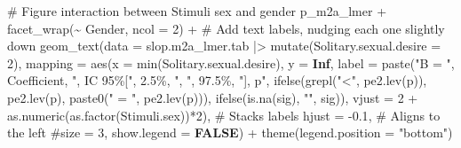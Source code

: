 \documentclass[
  bookmarksnumbered]{article}
\newenvironment{Shaded}{\begin{snugshade}}{\end{snugshade}}
\newcommand{\AttributeTok}[1]{\textcolor[rgb]{0.80,0.80,0.80}{#1}}
\newcommand{\CommentTok}[1]{\textcolor[rgb]{0.50,0.62,0.50}{#1}}
\newcommand{\ConstantTok}[1]{\textcolor[rgb]{0.86,0.64,0.64}{\textbf{#1}}}
\newcommand{\DecValTok}[1]{\textcolor[rgb]{0.86,0.86,0.80}{#1}}
\newcommand{\FloatTok}[1]{\textcolor[rgb]{0.75,0.75,0.82}{#1}}
\newcommand{\FunctionTok}[1]{\textcolor[rgb]{0.94,0.94,0.56}{#1}}
\newcommand{\NormalTok}[1]{\textcolor[rgb]{0.80,0.80,0.80}{#1}}
\newcommand{\SpecialCharTok}[1]{\textcolor[rgb]{0.86,0.64,0.64}{#1}}
\newcommand{\StringTok}[1]{\textcolor[rgb]{0.80,0.58,0.58}{#1}}
\begin{document}
\begin{Shaded}
\begin{Highlighting}[]
\CommentTok{\# Figure interaction between Stimuli sex and gender}
\NormalTok{p\_m2a\_lmer  }\SpecialCharTok{+}
  \FunctionTok{facet\_wrap}\NormalTok{(}\SpecialCharTok{\textasciitilde{}}\NormalTok{ Gender, }\AttributeTok{ncol =} \DecValTok{2}\NormalTok{) }\SpecialCharTok{+}
  \CommentTok{\# Add text labels, nudging each one slightly down}
  \FunctionTok{geom\_text}\NormalTok{(}\AttributeTok{data =}\NormalTok{ slop.m2a\_lmer.tab }\SpecialCharTok{|\textgreater{}} 
              \FunctionTok{mutate}\NormalTok{(}\AttributeTok{Solitary.sexual.desire =} \DecValTok{2}\NormalTok{),}
            \AttributeTok{mapping =} \FunctionTok{aes}\NormalTok{(}\AttributeTok{x =} \FunctionTok{min}\NormalTok{(Solitary.sexual.desire), }\AttributeTok{y =} \ConstantTok{Inf}\NormalTok{, }
                          \AttributeTok{label =} \FunctionTok{paste}\NormalTok{(}\StringTok{"B = "}\NormalTok{, Coefficient, }
                                        \StringTok{", IC 95\%["}\NormalTok{, }\StringTok{\textasciigrave{}}\AttributeTok{2.5\%}\StringTok{\textasciigrave{}}\NormalTok{, }\StringTok{", "}\NormalTok{, }\StringTok{\textasciigrave{}}\AttributeTok{97.5\%}\StringTok{\textasciigrave{}}\NormalTok{, }
                                        \StringTok{"], p"}\NormalTok{, }
                                        \FunctionTok{ifelse}\NormalTok{(}\FunctionTok{grepl}\NormalTok{(}\StringTok{"\textless{}"}\NormalTok{, }\FunctionTok{pe2.lev}\NormalTok{(p)), }\FunctionTok{pe2.lev}\NormalTok{(p), }
                                               \FunctionTok{paste0}\NormalTok{(}\StringTok{" = "}\NormalTok{, }\FunctionTok{pe2.lev}\NormalTok{(p))),}
                                        \FunctionTok{ifelse}\NormalTok{(}\FunctionTok{is.na}\NormalTok{(sig), }\StringTok{""}\NormalTok{, sig)),}
                          \AttributeTok{vjust =} \DecValTok{2} \SpecialCharTok{+} \FunctionTok{as.numeric}\NormalTok{(}\FunctionTok{as.factor}\NormalTok{(Stimuli.sex))}\SpecialCharTok{*}\DecValTok{2}\NormalTok{),  }\CommentTok{\# Stacks labels}
            \AttributeTok{hjust =} \SpecialCharTok{{-}}\FloatTok{0.1}\NormalTok{,  }\CommentTok{\# Aligns to the left}
            \CommentTok{\#size = 3,}
            \AttributeTok{show.legend =} \ConstantTok{FALSE}\NormalTok{) }\SpecialCharTok{+}
  \FunctionTok{theme}\NormalTok{(}\AttributeTok{legend.position =} \StringTok{"bottom"}\NormalTok{)}
\end{Highlighting}
\end{Shaded}
\end{document}
